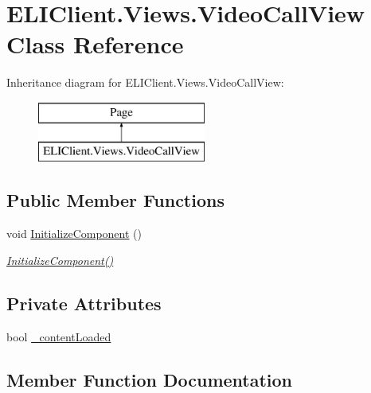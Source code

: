 \hypertarget{class_e_l_i_client_1_1_views_1_1_video_call_view}{}\section{E\+L\+I\+Client.\+Views.\+Video\+Call\+View Class Reference}
\label{class_e_l_i_client_1_1_views_1_1_video_call_view}
Inheritance diagram for E\+L\+I\+Client.\+Views.\+Video\+Call\+View\+:\begin{figure}[H]
\begin{center}
\leavevmode
\includegraphics[height=2.000000cm]{d9/d20/class_e_l_i_client_1_1_views_1_1_video_call_view}
\end{center}
\end{figure}
\subsection*{Public Member Functions}
\begin{DoxyCompactItemize}
\item 
void \hyperlink{class_e_l_i_client_1_1_views_1_1_video_call_view_a54485f3f02976e9fb97c39a5f7d78450}{Initialize\+Component} ()
\begin{DoxyCompactList}\small\item\em \hyperlink{class_e_l_i_client_1_1_views_1_1_video_call_view_a54485f3f02976e9fb97c39a5f7d78450}{Initialize\+Component()} \end{DoxyCompactList}\end{DoxyCompactItemize}
\subsection*{Private Attributes}
\begin{DoxyCompactItemize}
\item 
bool \hyperlink{class_e_l_i_client_1_1_views_1_1_video_call_view_a8e68364d70c564fcc149848f6a8792f1}{\+\_\+content\+Loaded}
\end{DoxyCompactItemize}


\subsection{Member Function Documentation}
\mbox{\label{class_e_l_i_client_1_1_views_1_1_video_call_view_a54485f3f02976e9fb97c39a5f7d78450}} 
